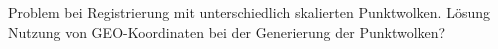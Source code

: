 \documentclass[12pt,titlepage, twoside]{article}
\begin{document}
Problem bei Registrierung mit unterschiedlich skalierten Punktwolken. Lösung Nutzung von GEO-Koordinaten bei der Generierung der Punktwolken?


\newpage



\end{document}
